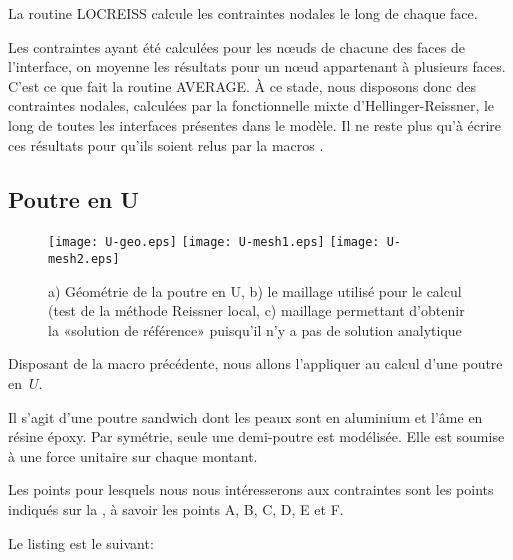 \medskip
La routine LOCREISS calcule les contraintes nodales le long de chaque face.

\medskip
Les contraintes ayant été calculées pour les nœuds de chacune des faces de l'interface, on moyenne les résultats
pour un nœud appartenant à plusieurs faces. C'est ce que fait la routine AVERAGE. À ce stade, nous disposons donc
des contraintes nodales, calculées par la fonctionnelle mixte d'Hellinger-Reissner,
le long de toutes les interfaces présentes dans le modèle. Il ne reste plus qu'à écrire ces résultats pour qu'ils soient relus par la 
macros \ansys.










\medskip
\subsection{Poutre en U}

\begin{figure}[ht]
  \texttt{[image: U-geo.eps]} \hfill
  \texttt{[image: U-mesh1.eps]}\hfill
  \texttt{[image: U-mesh2.eps]}
  \caption{\label{Fig-poutU-geo} a) Géométrie de la poutre en U, b) le maillage utilisé pour le calcul (test de la méthode Reissner local,
c) maillage permettant d'obtenir la «solution de référence» puisqu'il n'y a pas de solution analytique}
\end{figure}

Disposant de la macro précédente, nous allons l'appliquer au calcul d'une poutre en~$U$.

Il s'agit d'une poutre sandwich dont les peaux sont en aluminium et l'âme en résine époxy.
Par symétrie, seule une demi-poutre est modélisée. Elle est soumise à une force unitaire
sur chaque montant.

\medskip
Les points pour lesquels nous nous intéresserons aux contraintes sont les points indiqués sur la
, à savoir les points A, B, C, D, E et F.



\medskip
Le listing \ansys est le suivant:

